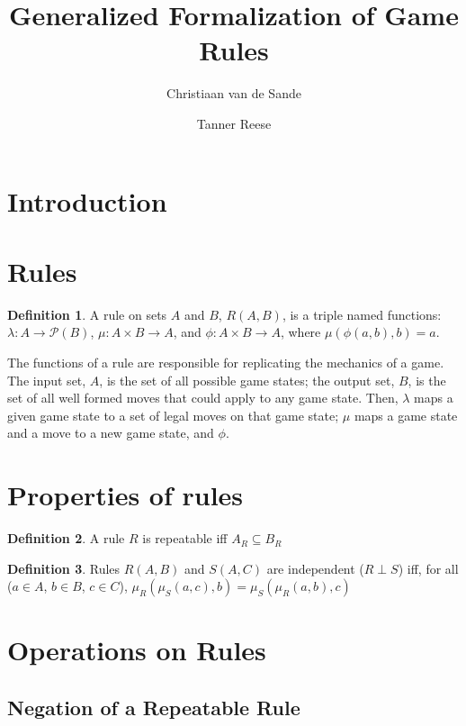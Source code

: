 \documentclass{article}
\title{Generalized Formalization of Game Rules}
\author{Christiaan van de Sande \and Tanner Reese}
\theoremstyle{definition}
\newtheorem{define}{Definition}[section]
\theoremstyle{plain}
\begin{document}
\maketitle

\section{Introduction}

\section{Rules}

\begin{define}
A rule on sets $A$ and $B$, $ R (A, B) $, is a triple named functions:
$ \lambda : A \rightarrow \mathcal{P} (B) $,
$ \mu : A \times B \rightarrow A $, 
and $ \phi : A \times B \rightarrow A $,
where $ \mu (\phi (a, b), b) = a $.
\end{define}

The functions of a rule are responsible for replicating the mechanics of a game.
The input set, $A$, is the set of all possible game states; the output set, $B$, is the set of all well formed moves that could apply to any game state.
Then, $\lambda$ maps a given game state to a set of legal moves on that game state;
$\mu$ maps a game state and a move to a new game state, and $\phi$.

\section{Properties of rules}

\begin{define}
A rule $R$ is repeatable iff $ A_R \subseteq B_R $
\end{define}

\begin{define}
Rules $ R (A, B) $ and $ S (A, C) $ are independent ($ R \perp S $) iff,
for all ($ a \in A $, $ b \in B $, $ c \in C $),
$ \mu_R (\mu_S (a, c), b) = \mu_S (\mu_R (a, b), c) $\\ 
\end{define}

\section{Operations on Rules}

\subsection{Negation of a Repeatable Rule}
\end{document}
